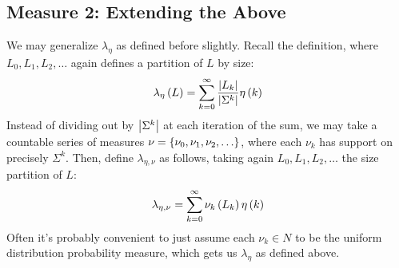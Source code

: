 \subsection{Measure 2: Extending the Above}
We may generalize \(\lambda_{\eta}\) as defined before slightly.
Recall the definition, where
\(L_0, L_1, L_2, \ldots\) again defines a partition of \(L\) by size:
\begin{align*}
  \lambda_{\eta}\left(L\right)
    = \sum_{k = 0}^{\infty} \frac{\left\lvert L_k\right\rvert}{\left\lvert\Sigma^k\right\rvert} \eta\left(k\right)
\end{align*}
Instead of dividing out by \(\left\lvert\Sigma^k\right\rvert\) at each iteration of the sum,
we may take a countable series of measures
\(\nu = \left\{\nu_0, \nu_1, \nu_2, \ldots\right\}\),
where each \(\nu_k\) has support on precisely \(\Sigma^k\).
Then, define \(\lambda_{\eta, \nu}\) as follows,
taking again \(L_0, L_1, L_2, \ldots\) the size partition of \(L\):
\begin{align*}
  \lambda_{\eta, \nu}
    = \sum_{k = 0}^{\infty} \nu_k \left(L_k\right) \eta\left(k\right)
\end{align*}
Often it's probably convenient to just assume each \(\nu_k \in N\)
to be the uniform distribution probability measure,
which gets us \(\lambda_{\eta}\) as defined above.

